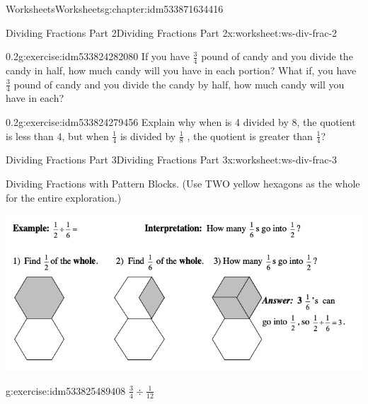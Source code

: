 \documentclass[twoside,11pt,]{book}
\begin{document}
\begin{chapterptx}{Worksheets}{}{Worksheets}{}{}{g:chapter:idm533871634416}
\begin{worksheet-section-numberless}{Dividing Fractions Part 2}{}{Dividing Fractions Part 2}{}{}{x:worksheet:ws-div-frac-2}
\begin{divisionexercise}{6}{}{0.2}{g:exercise:idm533824282080}%
If you have \(\frac{3}{4} \) pound of candy and you divide the candy in half, how much candy will you have in each portion? What if, you have \(\frac{3}{4} \) pound of candy and you divide the candy by half, how much candy will you have in each?%
\end{divisionexercise}%
\clearpage
\begin{divisionexercise}{7}{}{0.2}{g:exercise:idm533824279456}%
Explain why when is 4 divided by 8, the quotient is less than 4, but when \(\frac{1}{4} \)  is divided by \(\frac{1}{8} \) , the quotient is greater than \(\frac{1}{4} \)?%
\end{divisionexercise}%
\end{worksheet-section-numberless}
\restoregeometry
%
%
\typeout{************************************************}
\typeout{************************************************}
%
\begin{worksheet-section-numberless}{Dividing Fractions Part 3}{}{Dividing Fractions Part 3}{}{}{x:worksheet:ws-div-frac-3}
\begin{introduction}{}%
Dividing Fractions with Pattern Blocks. (Use TWO yellow hexagons as the whole for the entire exploration.)%
\begin{sidebyside}{1}{0}{0}{0}%
\begin{sbspanel}{1}%
\includegraphics[width=1\linewidth]{images/frac-div-hex-1.png}
\end{sbspanel}%
\end{sidebyside}%
\end{introduction}%
\begin{divisionexercise}{1}{}{}{g:exercise:idm533825489408}%
\(\frac{3}{4} \div \frac{1}{12} \)%
\begin{sidebyside}{1}{0.15}{0.15}{0}%
\begin{sbspanel}{0.7}%

\end{sbspanel}
\end{sidebyside}
\end{divisionexercise}
\end{worksheet-section-numberless}
\end{chapterptx}
\end{document}
